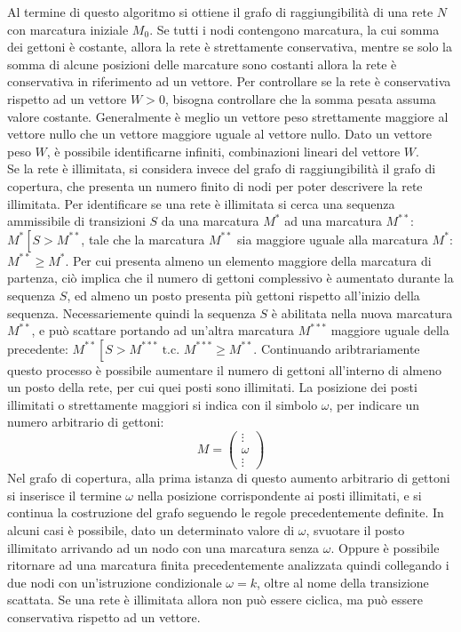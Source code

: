 \documentclass{article}
\numberwithin{equation}{subsection}
\begin{document}
Al termine di questo algoritmo si ottiene il grafo di raggiungibilità di una rete $N$ con marcatura iniziale $M_0$. 
Se tutti i nodi contengono marcatura, la cui somma dei gettoni è costante, allora la rete è strettamente conservativa, mentre se solo la somma di alcune posizioni delle 
marcature sono costanti allora la rete è conservativa in riferimento ad un vettore. Per controllare se la rete è conservativa rispetto ad un vettore $W>0$, bisogna controllare 
che la somma pesata assuma valore costante. Generalmente è meglio un vettore peso strettamente maggiore al vettore nullo che un vettore maggiore uguale al vettore nullo. 
Dato un vettore peso $W$, è possibile identificarne infiniti, combinazioni lineari del vettore $W$. 
\\
Se la rete è illimitata, si considera invece del grafo di raggiungibilità il grafo di copertura, che presenta un numero finito di nodi per poter descrivere la rete illimitata. 
Per identificare se una rete è illimitata si cerca una sequenza ammissibile di transizioni $S$ da una marcatura $M^*$ ad una marcatura $M^{**}$: $M^*\left[\right.S>M^{**}$, 
tale che la marcatura $M^{**}$ sia maggiore uguale alla marcatura $M^*$: $M^{**}\geq M^*$. Per cui presenta almeno un elemento maggiore della marcatura di partenza, ciò implica 
che il numero di gettoni complessivo è aumentato durante la sequenza $S$, ed almeno un posto presenta più gettoni rispetto all'inizio della sequenza. Necessariemente quindi la 
sequenza $S$ è abilitata nella nuova marcatura $M^{**}$, e può scattare portando ad un'altra marcatura $M^{***}$ maggiore uguale della precedente: 
$M^{**}\left[\right.S>M^{***}\mbox{ t.c. }M^{***}\geq M^{**}$. Continuando aribtrariamente questo processo è possibile aumentare il numero di gettoni all'interno di almeno un 
posto della rete, per cui quei posti sono illimitati. La posizione dei posti illimitati o strettamente maggiori si indica con il simbolo $\omega$, per indicare un numero 
arbitrario di gettoni:
\begin{equation*}
    M=\begin{pmatrix}
        \vdots\\
        \omega\\
        \vdots
    \end{pmatrix}
\end{equation*} 
Nel grafo di copertura, alla prima istanza di questo aumento arbitrario di gettoni si inserisce il termine $\omega$ nella posizione corrispondente ai 
posti illimitati, e si continua la costruzione del grafo seguendo le regole precedentemente definite. In alcuni casi è possibile, dato un determinato valore di $\omega$, 
svuotare il posto illimitato arrivando ad un nodo con una marcatura senza $\omega$. Oppure è possibile ritornare ad una marcatura finita precedentemente analizzata quindi 
collegando i due nodi con un'istruzione condizionale $\omega=k$, oltre al nome della transizione scattata. 
Se una rete è illimitata allora non può essere ciclica, ma può essere conservativa rispetto ad un vettore.
\end{document}
